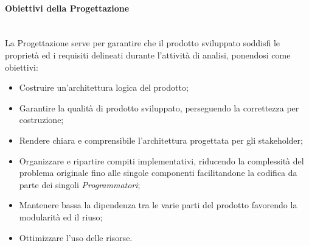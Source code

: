 \paragraph{Obiettivi della Progettazione} \-\\
\label{Progettazione_Obiettivi}
La Progettazione serve per garantire che il prodotto sviluppato soddisfi le proprietà ed i requisiti delineati durante l'attività di analisi, ponendosi come obiettivi:
\begin{itemize}
	\item Costruire un’architettura logica del prodotto;
	\item Garantire la qualità di prodotto sviluppato, perseguendo la correttezza per costruzione;
	\item Rendere chiara e comprensibile l'architettura progettata per gli stakeholder;
	\item Organizzare e ripartire compiti implementativi, riducendo la complessità del problema originale fino alle singole componenti facilitandone la codifica da parte dei
	singoli \textit{Programmatori};

	\item Mantenere bassa la dipendenza tra le varie parti del prodotto favorendo la modularità ed il riuso;
	\item Ottimizzare l'uso delle risorse.
\end{itemize}

